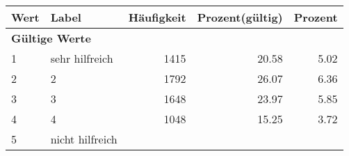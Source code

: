      \begin{longtable}{lXrrr}
     \toprule
     \textbf{Wert} & \textbf{Label} & \textbf{Häufigkeit} & \textbf{Prozent(gültig)} & \textbf{Prozent} \\
     \endhead
     \midrule
     \multicolumn{5}{l}{\textbf{Gültige Werte}}\\

     1 &
     \multicolumn{1}{X}{ sehr hilfreich   } &


       \num{1415} &
       \num[round-mode=places,round-precision=2]{20.58} &
         \num[round-mode=places,round-precision=2]{5.02} \\

     2 &
     \multicolumn{1}{X}{ 2   } &


       \num{1792} &
       \num[round-mode=places,round-precision=2]{26.07} &
         \num[round-mode=places,round-precision=2]{6.36} \\

     3 &
     \multicolumn{1}{X}{ 3   } &


       \num{1648} &
       \num[round-mode=places,round-precision=2]{23.97} &
         \num[round-mode=places,round-precision=2]{5.85} \\

     4 &
     \multicolumn{1}{X}{ 4   } &


       \num{1048} &
       \num[round-mode=places,round-precision=2]{15.25} &
         \num[round-mode=places,round-precision=2]{3.72} \\

     5 &
     \multicolumn{1}{X}{ nicht hilfreich   } &



\end{longtable}
